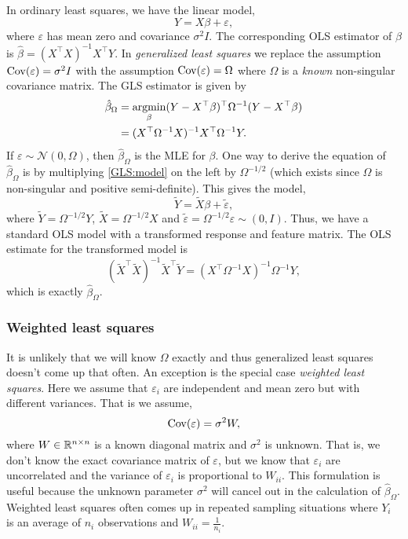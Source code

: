 In ordinary least squares, we have the linear model,
\begin{equation}\label{GLS:model}Y = X \beta + \varepsilon, \end{equation}
where $\varepsilon$ has mean zero and covariance $\sigma^2 I$. The corresponding OLS estimator of $\beta$ is $\hat{\beta}= (X^\top X)^{-1}X^\top Y$. In \emph{generalized least squares} we replace the assumption $\operatorname*{Cov}(\varepsilon) = \sigma^2 I$ with the assumption $\operatorname*{Cov}(\varepsilon) = \Omega$ where $\Omega$ is a \emph{known} non-singular covariance matrix. The GLS estimator is given by
\begin{align*}
    \hat{\beta}_\Omega &= \operatorname*{argmin}_\beta (Y-X^\top \beta)^\top \Omega^{-1} (Y-X^\top \beta)\\
    &=(X^\top \Omega^{-1} X)^{-1} X^\top \Omega^{-1}Y.
\end{align*}
If $\varepsilon \sim \mathcal{N}(0,\Omega)$, then $\hat{\beta}_{\Omega}$ is the MLE for $\beta$. One way to derive the equation of $\hat{\beta}_\Omega$ is by multiplying \eqref{GLS:model} on the left by $\Omega^{-1/2}$ (which exists since $\Omega$ is non-singular and positive semi-definite). This gives the model,
\[\widetilde{Y} = \widetilde{X}\beta + \widetilde{\varepsilon}, \]
where $\widetilde{Y}=\Omega^{-1/2}Y$, $\widetilde{X} = \Omega^{-1/2}X$ and $\widetilde{\varepsilon} = \Omega^{-1/2}\varepsilon \sim (0,I)$. Thus, we have a standard OLS model with a transformed response and feature matrix. The OLS estimate for the transformed model is
\[(\widetilde{X}^\top \widetilde{X})^{-1}\widetilde{X}^\top \widetilde{Y} = (X^\top \Omega^{-1}X)^{-1}\Omega^{-1}Y, \]
which is exactly $\hat{\beta}_\Omega$. 


\subsubsection*{Weighted least squares}

It is unlikely that we will know $\Omega$ exactly and thus generalized least squares doesn't come up that often. An exception is the special case \emph{weighted least squares}. Here we assume that $\varepsilon_i$ are independent and mean zero but with different variances. That is we assume,
\[ \operatorname*{Cov}(\varepsilon) = \sigma^2W,\]
where $W \in \mathbb{R}^{n \times n}$ is a known diagonal matrix and $\sigma^2$ is unknown. That is, we don't know the exact covariance matrix of $\varepsilon$, but we know that $\varepsilon_i$ are uncorrelated and the variance of $\varepsilon_i$ is proportional to $W_{ii}$. This formulation is useful because the unknown parameter $\sigma^2$ will cancel out in the calculation of $\hat{\beta}_\Omega$. Weighted least squares often comes up in repeated sampling situations where $Y_i$ is an average of $n_i$ observations and $W_{ii} = \frac{1}{{n_i}}$. 



